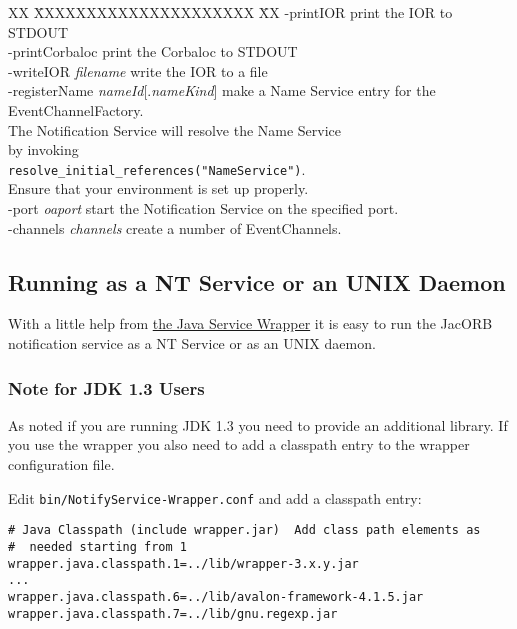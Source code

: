\begin{tabbing}
XX \= XXXXXXXXXXXXXXXXXXXXX \= XX \kill
\> -printIOR \> print the IOR to STDOUT \\
\> -printCorbaloc \> print the Corbaloc to STDOUT \\
\> -writeIOR \emph{filename} \> write the IOR to a file \\
\> -registerName \emph{nameId}[.\emph{nameKind}] \> make a Name Service entry
for the EventChannelFactory. \\
\> \> The Notification Service will resolve the Name Service \\
\> \> by invoking \\
\> \> \texttt{resolve\_initial\_references("NameService")}. \\
\> \> Ensure that your environment is set up properly. \\
\> -port \emph{oaport} \> start the Notification Service on the specified
port. \\
\> -channels \emph{channels} \> create a number of EventChannels. \\
\end{tabbing}

\subsection{Running as a NT Service or an UNIX Daemon}
\label{sec:runn-notif-serv-1}

With a little help from
\href{http://wrapper.tanukisoftware.org}{the Java Service Wrapper} it is
easy to run the JacORB notification service as a NT Service or as
an UNIX daemon.


\subsubsection{Note for JDK 1.3 Users}
\label{sec:ntfy-jdk1.3}

As noted if you are running JDK 1.3 you need to provide an
additional library. If you use the wrapper you also need to add a
classpath entry to the wrapper configuration file.

Edit \texttt{bin/NotifyService-Wrapper.conf} and add a classpath
entry:

\begin{verbatim}
# Java Classpath (include wrapper.jar)  Add class path elements as
#  needed starting from 1
wrapper.java.classpath.1=../lib/wrapper-3.x.y.jar
...
wrapper.java.classpath.6=../lib/avalon-framework-4.1.5.jar
wrapper.java.classpath.7=../lib/gnu.regexp.jar
\end{verbatim}

